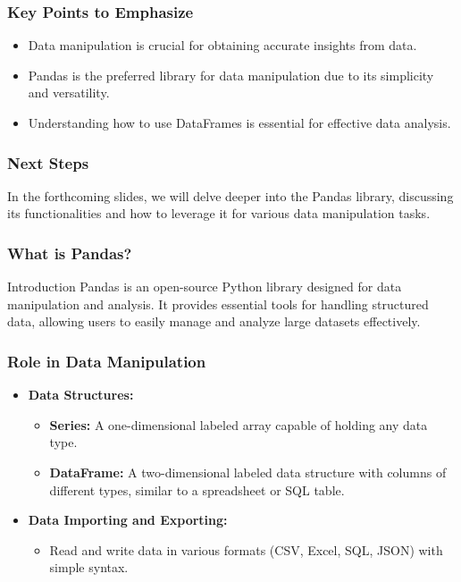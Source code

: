\documentclass[aspectratio=169]{beamer}
\begin{document}
\begin{frame}
    \frametitle{Key Points to Emphasize}

    \begin{itemize}
        \item Data manipulation is crucial for obtaining accurate insights from data.
        \item Pandas is the preferred library for data manipulation due to its simplicity and versatility.
        \item Understanding how to use DataFrames is essential for effective data analysis.
    \end{itemize}
\end{frame}

\begin{frame}
    \frametitle{Next Steps}

    In the forthcoming slides, we will delve deeper into the Pandas library, discussing its functionalities and how to leverage it for various data manipulation tasks.
\end{frame}

\begin{frame}[fragile]
    \frametitle{What is Pandas?}
    \begin{block}{Introduction}
        Pandas is an open-source Python library designed for data manipulation and analysis. It provides essential tools for handling structured data, allowing users to easily manage and analyze large datasets effectively.
    \end{block}
\end{frame}

\begin{frame}[fragile]
    \frametitle{Role in Data Manipulation}
    \begin{itemize}
        \item \textbf{Data Structures:}
        \begin{itemize}
            \item \textbf{Series:} A one-dimensional labeled array capable of holding any data type.
            \item \textbf{DataFrame:} A two-dimensional labeled data structure with columns of different types, similar to a spreadsheet or SQL table.
        \end{itemize}
        
        \item \textbf{Data Importing and Exporting:} 
        \begin{itemize}
            \item Read and write data in various formats (CSV, Excel, SQL, JSON) with simple syntax.
        \end{itemize}
    \end{itemize}
\end{frame}
\end{document}
